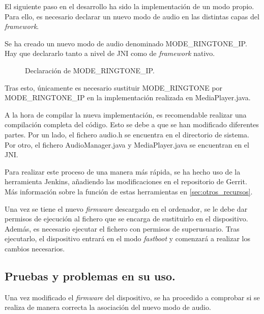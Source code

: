 El siguiente paso en el desarrollo ha sido la implementación de un modo propio. Para ello, es necesario declarar un nuevo modo de audio en las distintas capas del \textit{framework}.

Se ha creado un nuevo modo de audio denominado MODE\_RINGTONE\_IP. Hay que declararlo tanto a nivel de \gls{JNI} como de \textit{framework} nativo.

\begin{figure}[H]
	\centering
	\caption{Declaración de MODE\_RINGTONE\_IP.} \label{fig:mode_ringtone_ip}
\end{figure}

Tras esto, únicamente es necesario sustituir MODE\_RINGTONE por \\ MODE\_RINGTONE\_IP en la implementación realizada en MediaPlayer.java.

A la hora de compilar la nueva implementación, es recomendable realizar una compilación completa del código. Esto se debe a que se han modificado diferentes partes. Por un lado, el fichero audio.h se encuentra en el directorio de sistema. Por otro, el fichero AudioManager.java y MediaPlayer.java se encuentran en el \gls{JNI}.

Para realizar este proceso de una manera más rápida, se ha hecho uso de la herramienta Jenkins, añadiendo las modificaciones en el repositorio de Gerrit. Más información sobre la función de estas herramientas en \ref{sec:otros_recursos}.

Una vez se tiene el nuevo \textit{firmware} descargado en el ordenador, se le debe dar permisos de ejecución al fichero que se encarga de sustituirlo en el dispositivo. Además, es necesario ejecutar el fichero con permisos de superusuario. Tras ejecutarlo, el dispositivo entrará en el modo \textit{fastboot} y comenzará a realizar los cambios necesarios.
 
\subsection{Pruebas y problemas en su uso.} \label{sec:pruebas_nuevo_modo}
Una vez modificado el \textit{firmware} del dispositivo, se ha procedido a comprobar si se realiza de manera correcta la asociación del nuevo modo de audio.

